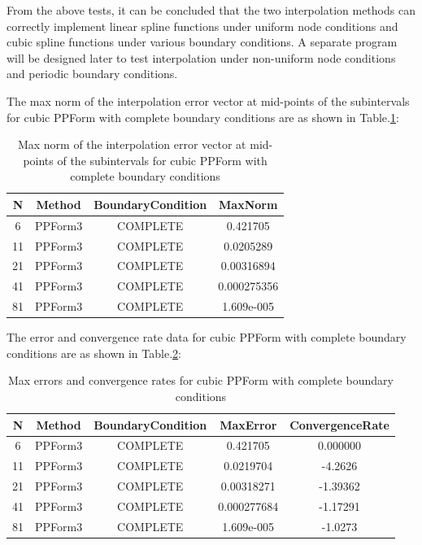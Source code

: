 \documentclass[a4paper]{article}
\begin{document}
\begin{sloppypar}
From the above tests, it can be concluded that the two interpolation methods
can correctly implement linear spline functions under uniform node conditions
and cubic spline functions under various boundary conditions. A separate
program will be designed later to test interpolation under non-uniform node
conditions and periodic boundary conditions.

The max norm of the interpolation error vector at mid-points of the subintervals for cubic PPForm with complete boundary
conditions are as shown in Table.\ref{tab:maxnorm_error}:

\begin{table}[H]
  \centering
  \renewcommand{\tablename}{Table.}
  \caption{Max norm of the interpolation error vector at mid-points of the subintervals for cubic PPForm with complete boundary conditions}
  \label{tab:maxnorm_error}
  \begin{tabular}{|c|c|c|c|}
    \hline
    N  & Method  & BoundaryCondition & MaxNorm \\
    \hline
    6  & PPForm3 & COMPLETE          & 0.421705 \\
    11 & PPForm3 & COMPLETE          & 0.0205289 \\
    21 & PPForm3 & COMPLETE          & 0.00316894 \\
    41 & PPForm3 & COMPLETE          & 0.000275356 \\
    81 & PPForm3 & COMPLETE          & 1.609e-005 \\
    \hline
  \end{tabular}
\end{table}

The error and convergence rate data for cubic PPForm with complete boundary
conditions are as shown in Table.\ref{tab:maxerror_convergence}:
\begin{table}[H]
  \centering
  \renewcommand{\tablename}{Table.}
  \caption{Max errors and convergence rates for cubic PPForm with complete boundary conditions}
  \label{tab:maxerror_convergence}
  \begin{tabular}{|c|c|c|c|c|}
    \hline
    N  & Method  & BoundaryCondition & MaxError & ConvergenceRate \\
    \hline
    6  & PPForm3 & COMPLETE          & 0.421705 & 0.000000        \\
    11 & PPForm3 & COMPLETE          & 0.0219704 & -4.2626        \\
    21 & PPForm3 & COMPLETE          & 0.00318271 & -1.39362        \\
    41 & PPForm3 & COMPLETE          & 0.000277684 & -1.17291        \\
    81 & PPForm3 & COMPLETE          & 1.609e-005 & -1.0273        \\
    \hline
  \end{tabular}
\end{table}


\end{sloppypar}
\end{document}
